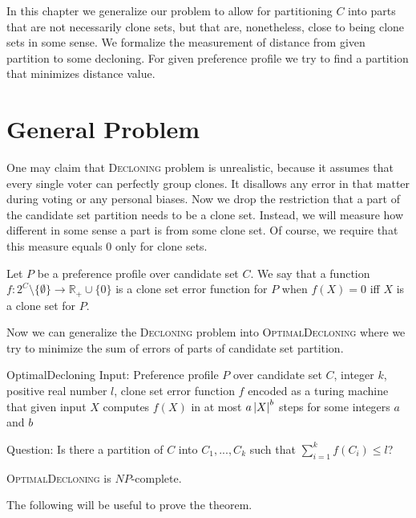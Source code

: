 In this chapter we generalize our problem to allow for partitioning $C$ into parts
that are not necessarily clone sets, but that are, nonetheless, close to being clone sets in some sense.
We formalize the measurement of distance from given partition to some decloning.
For given preference profile we try to find a partition that minimizes distance value.

\section{General Problem}

One may claim that \textsc{Decloning} problem is unrealistic,
because it assumes that every single voter can perfectly group clones.
It disallows any error in that matter during voting or any personal biases.
Now we drop the restriction that a part of the candidate set partition needs to be a clone set.
Instead, we will measure how different in some sense a part is from some clone set.
Of course, we require that this measure equals $0$ only for clone sets.

\begin{defn}
Let $P$ be a preference profile over candidate set $C$.
We say that a function
$f: 2^C \setminus \{\emptyset\} \rightarrow \mathbb{R}_+\cup\{0\}$
is a clone set error function for $P$ when $f(X) = 0$ iff $X$ is a clone set for $P$.
\end{defn}

Now we can generalize the \textsc{Decloning} problem into \textsc{OptimalDecloning}
where we try to minimize the sum of errors of parts of candidate set partition.

\begin{problem}{OptimalDecloning}
	Input: Preference profile $P$ over candidate set $C$, integer $k$, positive real number $l$,
        clone set error function $f$ encoded as a turing machine that given input $X$ computes $f(X)$
        in at most $a \left\vert X \right\vert^b$ steps for some integers $a$ and $b$

	Question: Is there a partition of $C$ into $C_1, ..., C_k$ such that $\sum_{i=1}^k f(C_i) \leq l$?
\end{problem}

\begin{thm} \label{optdecl}
	\textsc{OptimalDecloning} is $NP$-complete.
\end{thm}

The following will be useful to prove the theorem.

